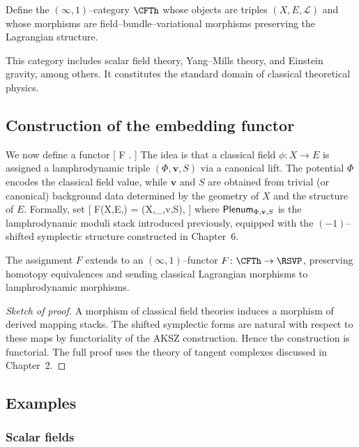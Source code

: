 \begin{definition}
Define the $(\infty,1)$--category $\CFTh$ whose objects are triples $(X,E,\mathcal{L})$ and whose morphisms are field--bundle--variational morphisms preserving the Lagrangian structure.
\end{definition}

This category includes scalar field theory, Yang--Mills theory, and Einstein gravity, among others. It constitutes the standard domain of classical theoretical physics.

\subsection{Construction of the embedding functor}

We now define a functor
[
F \colon \CFTh \longrightarrow \RSVP.
]
The idea is that a classical field $\phi \colon X \to E$ is assigned a lamphrodynamic triple $(\Phi,\mathbf v,S)$ via a canonical lift. The potential $\Phi$ encodes the classical field value, while $\mathbf v$ and $S$ are obtained from trivial (or canonical) background data determined by the geometry of $X$ and the structure of $E$. Formally, set
[
F(X,E,) = \Map(X,\Plenum_{\Phi,\mathbf v,S}),
]
where $\mathsf{Plenum}_{\Phi,\mathbf v,S}$ is the lamphrodynamic moduli stack introduced previously, equipped with the $(-1)$--shifted symplectic structure constructed in Chapter~6.

\begin{proposition}
The assignment $F$ extends to an $(\infty,1)$--functor $F \colon \CFTh \to \RSVP$, preserving homotopy equivalences and sending classical Lagrangian morphisms to lamphrodynamic morphisms.
\end{proposition}

\begin{proof}[Sketch of proof]
A morphism of classical field theories induces a morphism of derived mapping stacks. The shifted symplectic forms are natural with respect to these maps by functoriality of the AKSZ construction. Hence the construction is functorial. The full proof uses the theory of tangent complexes discussed in Chapter~2.
\end{proof}

\subsection{Examples}

\subsubsection{Scalar fields}


